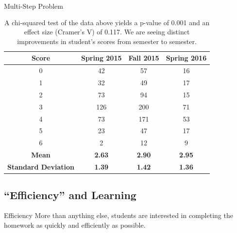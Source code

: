 \documentclass[xcolor=x11names,compress]{beamer}
\begin{document}
\begin{frame}{Multi-Step Problem}
\begin{table}[ht]
  \caption{A chi-squared test of the data above yields a p-value of 0.001 and an effect size (Cramer's V) of 0.117. We are seeing distinct improvements in student's scores from semester to semester.}
  \begin{center}
    \begin{tabular}{|c|c|c|c|}
      \hline
      \textbf{Score} & \textbf{Spring 2015} & \textbf{Fall 2015} & \textbf{Spring 2016}\\
      \hline
      0 & 42 & 57 & 16\\
      \hline
      1 & 32 & 49 & 17\\
      \hline
      2 & 73 & 94 & 15\\
      \hline
      3 & 126 & 200 & 71\\
      \hline
      4 & 73 & 171 & 53\\
      \hline
      5 & 23 & 47 & 17\\
      \hline
      6 & 2 & 12 & 9\\
      \hline
      \textbf{Mean} & \textbf{2.63} & \textbf{2.90} & \textbf{2.95}\\
      \hline
      \textbf{Standard Deviation} & \textbf{1.39} & \textbf{1.42} & \textbf{1.36}\\
      \hline
    \end{tabular}
  \end{center}
  \label{tab:multi-step}
\end{table}
\end{frame}

\subsection{``Efficiency'' and Learning}

\begin{frame}{Efficiency}
	More than anything else, students are interested in completing the homework as quickly and efficiently as possible.
\end{frame}
\end{document}
